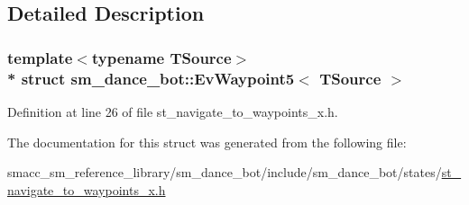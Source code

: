 \subsection{Detailed Description}
\subsubsection*{template$<$typename T\+Source$>$\\*
struct sm\+\_\+dance\+\_\+bot\+::\+Ev\+Waypoint5$<$ T\+Source $>$}



Definition at line 26 of file st\+\_\+navigate\+\_\+to\+\_\+waypoints\+\_\+x.\+h.



The documentation for this struct was generated from the following file\+:\begin{DoxyCompactItemize}
\item 
smacc\+\_\+sm\+\_\+reference\+\_\+library/sm\+\_\+dance\+\_\+bot/include/sm\+\_\+dance\+\_\+bot/states/\hyperlink{st__navigate__to__waypoints__x_8h}{st\+\_\+navigate\+\_\+to\+\_\+waypoints\+\_\+x.\+h}\end{DoxyCompactItemize}
